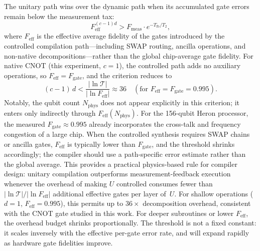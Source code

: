 \documentclass[11pt]{article}
\begin{document}
The unitary path wins over the dynamic path when its accumulated gate errors remain below the measurement tax:
\begin{equation}
F_{\text{eff}}^{(c-1)d} > F_{\text{meas}} \cdot e^{-T_{\text{fb}}/T_2},
\label{eq:unitary_threshold}
\end{equation}
where $F_{\text{eff}}$ is the effective average fidelity of the gates introduced by the controlled compilation path---including SWAP routing, ancilla operations, and non-native decompositions---rather than the global chip-average gate fidelity.
For native CNOT (this experiment, $c = 1$), the controlled path adds no auxiliary operations, so $F_{\text{eff}} = F_{\text{gate}}$, and the criterion reduces to
\begin{equation}
(c-1)\,d < \frac{|\ln \mathcal{T}|}{|\ln F_{\text{eff}}|} \approx 36 \quad (\text{for } F_{\text{eff}} = F_{\text{gate}} = 0.995).
\end{equation}
Notably, the qubit count $N_{\text{phys}}$ does not appear explicitly in this criterion; it enters only indirectly through $F_{\text{eff}}(N_{\text{phys}})$.
For the 156-qubit Heron processor, the measured $F_{\text{gate}} \approx 0.995$ already incorporates the cross-talk and frequency congestion of a large chip.
When the controlled synthesis requires SWAP chains or ancilla gates, $F_{\text{eff}}$ is typically lower than $F_{\text{gate}}$, and the threshold shrinks accordingly; the compiler should use a path-specific error estimate rather than the global average.
This provides a practical physics-based rule for compiler design: unitary compilation outperforms measurement-feedback execution whenever the overhead of making $U$ controlled consumes fewer than $|\ln\mathcal{T}|/|\ln F_{\text{eff}}|$ additional effective gates per layer of~$U$.
For shallow operations ($d=1$, $F_{\text{eff}} = 0.995$), this permits up to $36\times$ decomposition overhead, consistent with the CNOT gate studied in this work.
For deeper subroutines or lower $F_{\text{eff}}$, the overhead budget shrinks proportionally.
The threshold is not a fixed constant: it scales inversely with the effective per-gate error rate, and will expand rapidly as hardware gate fidelities improve.
\end{document}

